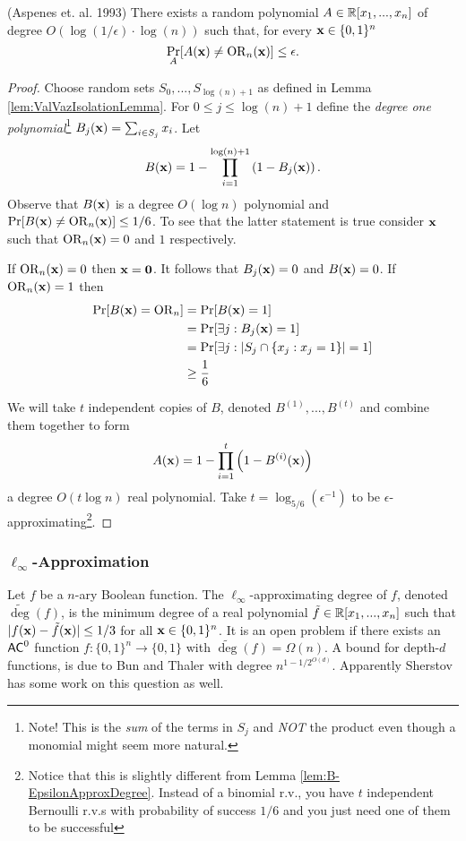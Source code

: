 \documentclass[11pt]{article}
\begin{document}
	\begin{lemma}
		\label{lem:UB-DegreeRealApproxPoly-Aspenes}
		(Aspenes et. al. 1993) There exists a random polynomial $A \in \mathbb{R}[x_1, ..., x_n]$ of degree $O(\log(1/\epsilon)\cdot \log(n))$ such that, for every $\mathbf{x} \in \{0,1\}^n$
		\[\Pr_{A}[A(\mathbf{x}) \neq \mathrm{OR}_n(\mathbf{x})] \leq \epsilon.\]
	\end{lemma}
	\begin{proof}
		Choose random sets $S_0,..., S_{\log(n) + 1}$ as defined in Lemma \ref{lem:ValVazIsolationLemma}. For $0 \leq j \leq \log(n) + 1$ define the \emph{degree one polynomial}\footnote{Note! This is the \emph{sum} of the terms in $S_j$ and \emph{NOT} the product even though a monomial might seem more natural.} $B_j(\mathbf{x}) = \sum_{i \in S_j}x_i$. Let 
		\[B(\mathbf{x}) = 1 - \prod_{i = 1}^{\log(n) + 1}\left(1 - B_j(\mathbf{x})\right).\]
		Observe that $B(\mathbf{x})$ is a degree $O(\log n)$ polynomial and $\Pr[B(\mathbf{x}) \neq \mathrm{OR}_n(\mathbf{x})] \leq 1/6$. To see that the latter statement is true consider $\mathbf{x}$ such that $\mathrm{OR}_n(\mathbf{x}) = 0$ and $1$ respectively. 
		
		If $\mathrm{OR}_n(\mathbf{x}) = 0$ then $\mathbf{x} = \mathbf{0}$. It follows that $B_j(\mathbf{x}) = 0$ and $B(\mathbf{x}) = 0$.  If $\mathrm{OR}_n(\mathbf{x}) = 1$ then
		\begin{align*}
			\Pr[B(\mathbf{x}) = \mathrm{OR}_{n}] 
				&= \Pr[B(\mathbf{x}) = 1]\\
				&= \Pr[\exists j: B_j(\mathbf{x}) = 1]\\
				&= \Pr[\exists j: |S_{j} \cap \{x_j: x_j = 1\}| = 1]\\
				&\geq \frac{1}{6}
		\end{align*}
		
		We will take $t$ independent copies of $B$, denoted $B^{(1)}, ..., B^{(t)}$ and combine them together to form
		\[A(\mathbf{x}) = 1 - \prod_{i = 1}^{t}\left(1 - B^{(i)}(\mathbf{x})\right)\]
		a degree $O(t\log n)$ real polynomial. Take $t = \log_{5/6}(\epsilon^{-1})$ to be $\epsilon$-approximating\footnote{Notice that this is slightly different from Lemma \ref{lem:B-EpsilonApproxDegree}. Instead of a binomial r.v., you have $t$ independent Bernoulli r.v.s with probability of success $1/6$ and you just need one of them to be successful}. 
	\end{proof}
	
	\subsubsection{\texorpdfstring{$\ell_{\infty}$}{l_infty}-Approximation}
	Let $f$ be a $n$-ary Boolean function. The $\ell_{\infty}$-approximating degree of $f$, denoted $\tilde{\deg}(f)$, is the minimum degree of a real polynomial $\tilde{f} \in \mathbb{R}[x_1, ..., x_n]$ such that $|f(\mathbf{x}) - \tilde{f}(\mathbf{x})| \leq 1/3$ for all $\mathbf{x} \in \{0,1\}^n$. It is an open problem if there exists an $\mathsf{AC}^0$ function $f: \{0,1\}^n \rightarrow \{0,1\}$ with $\tilde{\deg}(f) = \Omega(n)$.  A bound for depth-$d$ functions, is due to Bun and Thaler with degree $n^{1 - 1/2^{O(d)}}$. Apparently Sherstov has some work on this question as well.
	
\end{document}
